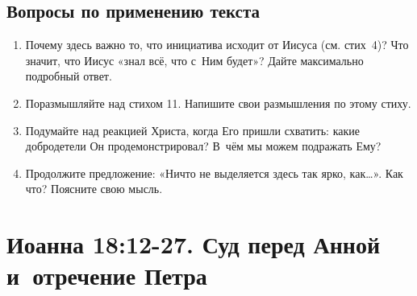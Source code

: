 \documentclass[a4paper,12pt]{article}
\begin{document}
\subsection*{Вопросы по применению текста} 
\begin{enumerate}
    \item Почему здесь важно то, что инициатива исходит от Иисуса (см. стих~4)? Что значит, что Иисус «знал всё, что с~Ним будет»? Дайте максимально подробный ответ. 
    
    \myline
    
    \myline
    \item Поразмышляйте над стихом 11. Напишите свои размышления по этому стиху. 
    
    \myline
    
    \myline
    \item Подумайте над реакцией Христа, когда Его пришли схватить: какие добродетели Он продемонстрировал? В~чём мы можем подражать Ему? 
    
    \myline
    
    \myline
    \item Продолжите предложение: «Ничто не выделяется здесь так ярко, как…». Как что? Поясните свою мысль.
    
    \myline
    
    \myline
\end{enumerate}



\section{Иоанна 18:12-27. Суд перед Анной и~отречение Петра}
\end{document}
